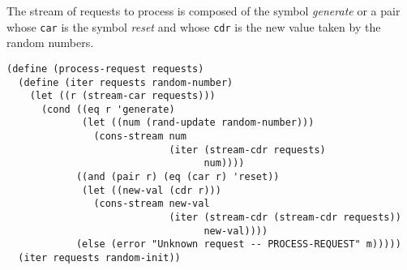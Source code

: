 \documentclass[a4paper,12pt]{article}
\begin{document}
The stream of requests to process is composed of the symbol
\emph{generate} or a pair whose \lstinline!car! is the symbol
\emph{reset} and whose \lstinline!cdr! is the new value taken by the
random numbers.

\begin{lstlisting}
(define (process-request requests)
  (define (iter requests random-number)
    (let ((r (stream-car requests)))
      (cond ((eq r 'generate)
             (let ((num (rand-update random-number)))
               (cons-stream num
                            (iter (stream-cdr requests)
                                  num))))
            ((and (pair r) (eq (car r) 'reset))
             (let ((new-val (cdr r)))
               (cons-stream new-val
                            (iter (stream-cdr (stream-cdr requests))
                                  new-val))))
            (else (error "Unknown request -- PROCESS-REQUEST" m)))))
  (iter requests random-init))
\end{lstlisting}
\end{document}
